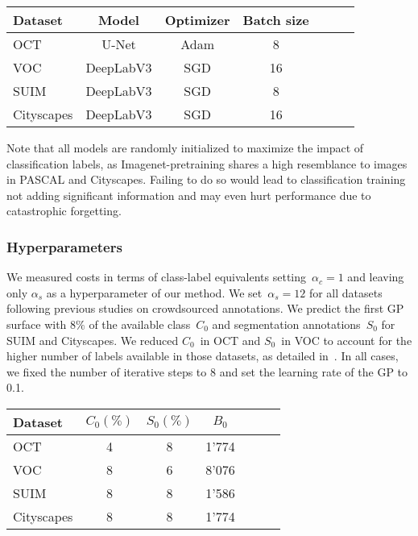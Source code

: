 \begin{table}
\centering
\begin{tabular}{lcccccc}
\toprule
\textbf{Dataset} & \textbf{Model} &  \textbf{Optimizer} & \textbf{Batch size} \\ \midrule
OCT & U-Net &  Adam & 8  \\
VOC & DeepLabV3 &  SGD & 16 \\
SUIM & DeepLabV3 &  SGD & 8  \\ 
Cityscapes & DeepLabV3 & SGD & 16   \\ \bottomrule
\end{tabular}
\end{table}

Note that all models are randomly initialized to maximize the impact of classification labels, as Imagenet-pretraining shares a high resemblance to images in PASCAL and Cityscapes. Failing to do so would lead to classification training not adding significant information and may even hurt performance due to catastrophic forgetting.

\subsubsection{Hyperparameters}
We measured costs in terms of class-label equivalents setting~$\alpha_c=1$ and leaving only $\alpha_s$ as a hyperparameter of our method. We set~$\alpha_s=12$ for all datasets following previous studies on crowdsourced annotations. We predict the first GP surface with $8\%$ of the available class~$C_0$ and segmentation annotations~$S_0$ for SUIM and Cityscapes. We reduced $C_0$~in OCT and $S_0$~in VOC to account for the higher number of labels available in those datasets, as detailed in~. In all cases, we fixed the number of iterative steps to 8 and set the learning rate of the GP to 0.1.

\begin{table}[h]
\centering
\begin{tabular}{lcccccc}
\toprule
\textbf{Dataset} & $C_0 (\%)$ & $S_0 (\%)$ & $B_0$ \\ \midrule
OCT & 4 & 8 & 1'774 \\
VOC & 8 & 6 & 8'076 \\
SUIM & 8 & 8 & 1'586 \\ 
Cityscapes & 8 & 8 & 1'774  \\ \bottomrule
\end{tabular}
\end{table}

